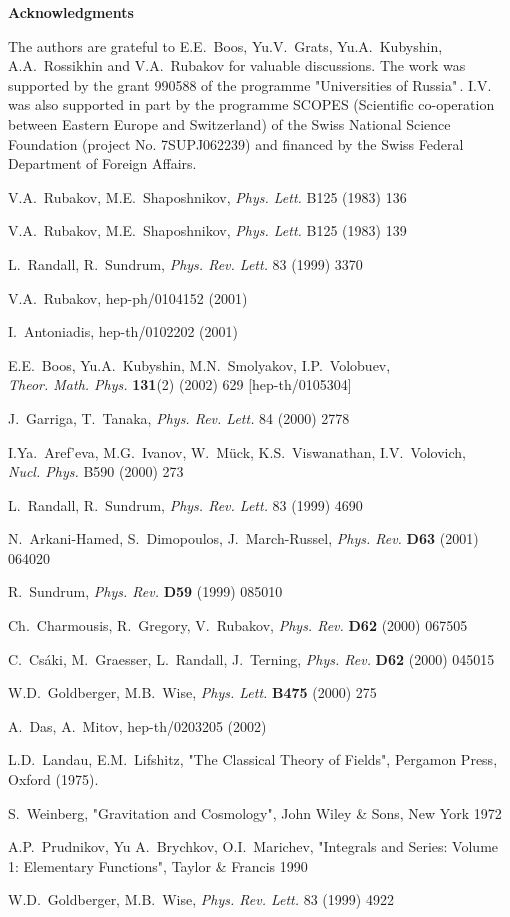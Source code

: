 \documentclass[a4paper,12pt]{article}
\begin{document}
\bigskip
{ \large \bf Acknowledgments}
\medskip

The authors are grateful to E.E.~Boos, Yu.V.~Grats, Yu.A.~Kubyshin,
A.A.~Rossikhin and V.A.~Rubakov for valuable discussions. The work  was
supported by the grant 990588 of the programme "Universities of Russia"\,.
I.V. was also supported in part by the programme SCOPES (Scientific
co-operation between Eastern Europe and Switzerland) of the Swiss National
Science Foundation (project No. 7SUPJ062239) and financed by the Swiss
Federal Department of Foreign Affairs.

\begin{thebibliography}{99}
V.A.~Rubakov, M.E.~Shaposhnikov, {\em Phys. Lett.} B125 (1983) 136

V.A.~Rubakov, M.E.~Shaposhnikov, {\em Phys. Lett.} B125 (1983) 139

L.~Randall, R.~Sundrum, {\em Phys. Rev. Lett.} 83 (1999) 3370

V.A.~Rubakov, hep-ph/0104152 (2001)

I.~Antoniadis, hep-th/0102202 (2001)

E.E.~Boos, Yu.A.~Kubyshin, M.N.~Smolyakov, I.P.~Volobuev,\\ {\em
Theor. Math. Phys.} {\bf 131}(2) (2002) 629 [hep-th/0105304]

J.~Garriga, T.~Tanaka, {\em Phys. Rev. Lett.} 84 (2000) 2778

 I.Ya.~Aref'eva, M.G.~Ivanov, W.~M\"uck,
K.S.~Viswanathan, I.V.~Volovich,\\ {\em Nucl. Phys.} B590 (2000)
273

L.~Randall, R.~Sundrum, {\em Phys. Rev. Lett.} 83 (1999) 4690

N.~Arkani-Hamed, S.~Dimopoulos, J.~March-Russel, {\em Phys. Rev.}
{\bf D63} (2001) 064020

R.~Sundrum, {\em Phys. Rev.} {\bf D59} (1999) 085010

Ch.~Charmousis, R.~Gregory, V.~Rubakov, {\em Phys. Rev.} {\bf D62}
(2000) 067505

C.~Cs\'aki, M.~Graesser, L.~Randall, J.~Terning, {\em Phys. Rev.}
{\bf D62} (2000) 045015

W.D.~Goldberger, M.B.~Wise, {\em Phys. Lett.} {\bf B475} (2000)
275

A.~Das, A.~Mitov, hep-th/0203205 (2002)

L.D.~Landau, E.M.~Lifshitz, "The Classical Theory of Fields",
Pergamon Press, Oxford (1975).

S.~Weinberg, "Gravitation and Cosmology", John Wiley \& Sons, New
York 1972

A.P.~Prudnikov, Yu A.~Brychkov, O.I.~Marichev, "Integrals and
Series: Volume 1: Elementary Functions", Taylor \& Francis 1990

W.D.~Goldberger, M.B.~Wise, {\em Phys. Rev. Lett.} 83 (1999) 4922


\end{thebibliography}
\end{document}
